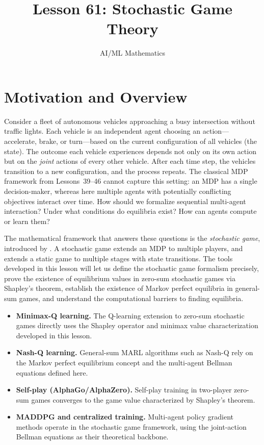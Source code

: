 \documentclass[11pt,a4paper]{article}
\title{Lesson 61: Stochastic Game Theory}
\author{AI/ML Mathematics}
\date{}
\begin{document}
\maketitle
\tableofcontents
\newpage

\section{Motivation and Overview}
\label{sec:motivation}

Consider a fleet of autonomous vehicles approaching a busy
intersection without traffic lights.  Each vehicle is an independent
agent choosing an action---accelerate, brake, or
turn---based on the current configuration of all vehicles (the state).
The outcome each vehicle experiences depends not only on its own
action but on the \emph{joint} actions of every other vehicle.  After
each time step, the vehicles transition to a new configuration, and
the process repeats.  The classical MDP framework from Lessons~39--46
cannot capture this setting: an MDP has a single decision-maker,
whereas here multiple agents with potentially conflicting objectives
interact over time.  How should we formalize sequential multi-agent
interaction?  Under what conditions do equilibria exist?  How can
agents compute or learn them?

The mathematical framework that answers these questions is the
\emph{stochastic game}, introduced by \citet{shapley1953}.  A
stochastic game extends an MDP to multiple players, and extends a
static game to multiple stages with state transitions.  The tools
developed in this lesson will let us define the stochastic game
formalism precisely, prove the existence of equilibrium values in
zero-sum stochastic games via Shapley's theorem, establish the
existence of Markov perfect equilibria in general-sum games, and
understand the computational barriers to finding equilibria.

\begin{rlconnection}[title={Why Stochastic Games Matter for RL/ML}]
\begin{itemize}[nosep]
  \item \textbf{Minimax-Q learning.}  The Q-learning extension to
    zero-sum stochastic games directly uses the Shapley operator and
    minimax value characterization developed in this lesson.
  \item \textbf{Nash-Q learning.}  General-sum MARL algorithms such as
    Nash-Q rely on the Markov perfect equilibrium concept and the
    multi-agent Bellman equations defined here.
  \item \textbf{Self-play (AlphaGo/AlphaZero).}  Self-play training
    in two-player zero-sum games converges to the game value
    characterized by Shapley's theorem.
  \item \textbf{MADDPG and centralized training.}  Multi-agent
    policy gradient methods operate in the stochastic game framework,
    using the joint-action Bellman equations as their theoretical
    backbone.
\end{itemize}
\end{rlconnection}
\end{document}
